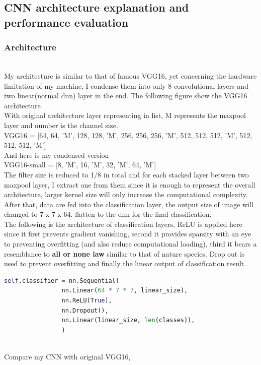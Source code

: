 \documentclass[11pt, a4paper]{article} %
\begin{document}
\subsection{CNN architecture explanation and performance evaluation} %
\subsubsection{Architecture}
\\ My architecture is similar to that of famous VGG16, yet concerning the hardware limitation of my machine, I condense them into only 8 convolutional layers and two linear(normal dnn) layer in the end.    The following figure show the VGG16 architecture
\\ \small{With original architecture layer representing in list, M represents the maxpool layer and number is the channel size.}
\\ VGG16 = [64, 64, 'M', 128, 128, 'M', 256, 256, 256, 'M', 512, 512, 512, 'M', 512, 512, 512, 'M']
\\ And here is my condensed version
\\ VGG16-small = [8, 'M', 16, 'M', 32, 'M', 64, 'M']
\\ The filter size is reduced to 1/8 in total and for each stacked layer between two maxpool layer, I extract one from them since it is enough to represent the overall architecture, larger kernel size will only increase the computational complexity. 
\\ After that, data are fed into the classification layer, the output size of image will changed to 7 x 7 x 64. flatten to the dnn for the final classification.
\\ The following is the architecture of classification layers, ReLU is applied here since it first prevents gradient vanishing, second it provides sparsity with an eye to preventing overfitting (and also reduce computational loading), third it bears a resemblance to \textbf{all or none law} similar to that of nature species. Drop out is used to prevent overfitting and finally the linear output of classification result.
\begin{lstlisting}[language = python]
self.classifier = nn.Sequential(
                nn.Linear(64 * 7 * 7, linear_size),
                nn.ReLU(True),
                nn.Dropout(),
                nn.Linear(linear_size, len(classes)),
                )
\end{lstlisting}
\\ Compare my CNN with original VGG16,   
\end{document}
